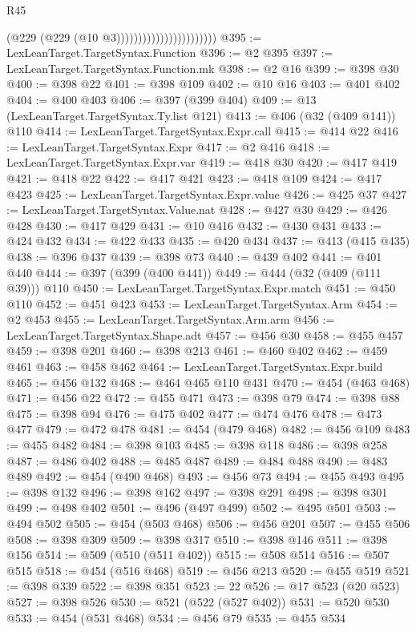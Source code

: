 \begin{lexlean}{R45}
\begin{coremodule}
                                            (@229 (@229 (@10 @3)))))))))))))))))))))))
@395 := LexLeanTarget.TargetSyntax.Function
@396 := @2 @395
@397 := LexLeanTarget.TargetSyntax.Function.mk
@398 := @2 @16
@399 := @398 @30
@400 := @398 @22
@401 := @398 @109
@402 := @10 @16
@403 := @401 @402
@404 := @400 @403
@406 := @397 (@399 @404)
@409 := @13 (LexLeanTarget.TargetSyntax.Ty.list @121)
@413 := @406 (@32 (@409 @141)) @110
@414 := LexLeanTarget.TargetSyntax.Expr.call
@415 := @414 @22
@416 := LexLeanTarget.TargetSyntax.Expr
@417 := @2 @416
@418 := LexLeanTarget.TargetSyntax.Expr.var
@419 := @418 @30
@420 := @417 @419
@421 := @418 @22
@422 := @417 @421
@423 := @418 @109
@424 := @417 @423
@425 := LexLeanTarget.TargetSyntax.Expr.value
@426 := @425 @37
@427 := LexLeanTarget.TargetSyntax.Value.nat
@428 := @427 @30
@429 := @426 @428
@430 := @417 @429
@431 := @10 @416
@432 := @430 @431
@433 := @424 @432
@434 := @422 @433
@435 := @420 @434
@437 := @413 (@415 @435)
@438 := @396 @437
@439 := @398 @73
@440 := @439 @402
@441 := @401 @440
@444 := @397 (@399 (@400 @441))
@449 := @444 (@32 (@409 (@111 @39))) @110
@450 := LexLeanTarget.TargetSyntax.Expr.match
@451 := @450 @110
@452 := @451 @423
@453 := LexLeanTarget.TargetSyntax.Arm
@454 := @2 @453
@455 := LexLeanTarget.TargetSyntax.Arm.arm
@456 := LexLeanTarget.TargetSyntax.Shape.adt
@457 := @456 @30
@458 := @455 @457
@459 := @398 @201
@460 := @398 @213
@461 := @460 @402
@462 := @459 @461
@463 := @458 @462
@464 := LexLeanTarget.TargetSyntax.Expr.build
@465 := @456 @132
@468 := @464 @465 @110 @431
@470 := @454 (@463 @468)
@471 := @456 @22
@472 := @455 @471
@473 := @398 @79
@474 := @398 @88
@475 := @398 @94
@476 := @475 @402
@477 := @474 @476
@478 := @473 @477
@479 := @472 @478
@481 := @454 (@479 @468)
@482 := @456 @109
@483 := @455 @482
@484 := @398 @103
@485 := @398 @118
@486 := @398 @258
@487 := @486 @402
@488 := @485 @487
@489 := @484 @488
@490 := @483 @489
@492 := @454 (@490 @468)
@493 := @456 @73
@494 := @455 @493
@495 := @398 @132
@496 := @398 @162
@497 := @398 @291
@498 := @398 @301
@499 := @498 @402
@501 := @496 (@497 @499)
@502 := @495 @501
@503 := @494 @502
@505 := @454 (@503 @468)
@506 := @456 @201
@507 := @455 @506
@508 := @398 @309
@509 := @398 @317
@510 := @398 @146
@511 := @398 @156
@514 := @509 (@510 (@511 @402))
@515 := @508 @514
@516 := @507 @515
@518 := @454 (@516 @468)
@519 := @456 @213
@520 := @455 @519
@521 := @398 @339
@522 := @398 @351
@523 := 22
@526 := @17 @523 (@20 @523)
@527 := @398 @526
@530 := @521 (@522 (@527 @402))
@531 := @520 @530
@533 := @454 (@531 @468)
@534 := @456 @79
@535 := @455 @534

\end{coremodule}
\end{lexlean}
